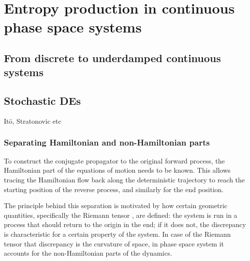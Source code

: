 \chapter{Entropy production in continuous phase space systems}

\section{From discrete to underdamped continuous systems}

\section{Stochastic DEs}

It\=o, Stratonovic etc


\subsection{Separating Hamiltonian and non-Hamiltonian parts}

To construct the conjugate propagator to the original forward process, the Hamiltonian part of the equations of motion needs to be known. This allows tracing the Hamiltonian flow back along the deterministic trajectory to reach the starting position of the reverse process, and similarly for the end position.

The principle behind this separation is motivated by how certain geometric quantities, specifically the Riemann tensor , are defined: the system is run in a process that should return to the origin in the end; if it does not, the discrepancy is characteristic for a certain property of the system. In case of the Riemann tensor that discrepancy is the curvature of space, in phase space system it accounts for the non-Hamiltonian parts of the dynamics.

